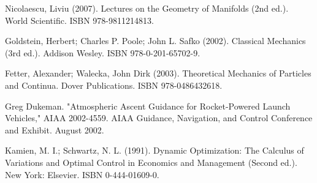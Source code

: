 \documentclass[11pt]{article}
\numberwithin{equation}{section}
\begin{document}
\begin{thebibliography}{99}

  Nicolaescu, Liviu (2007). Lectures on the Geometry of Manifolds (2nd ed.). World Scientific. ISBN 978-9811214813. 
  
  Goldstein, Herbert; Charles P. Poole; John L. Safko (2002). Classical Mechanics (3rd ed.). Addison Wesley. ISBN 978-0-201-65702-9.
  
  Fetter, Alexander; Walecka, John Dirk (2003). Theoretical Mechanics of Particles and Continua. Dover Publications. ISBN 978-0486432618.

  Greg Dukeman. "Atmospheric Ascent Guidance for Rocket-Powered Launch Vehicles," AIAA 2002-4559. AIAA Guidance, Navigation, and Control Conference and Exhibit. August 2002. 
  
  Kamien, M. I.; Schwartz, N. L. (1991). Dynamic Optimization: The Calculus of Variations and Optimal Control in Economics and Management (Second ed.). New York: Elsevier. ISBN 0-444-01609-0.
  

\end{thebibliography}
\end{document}
